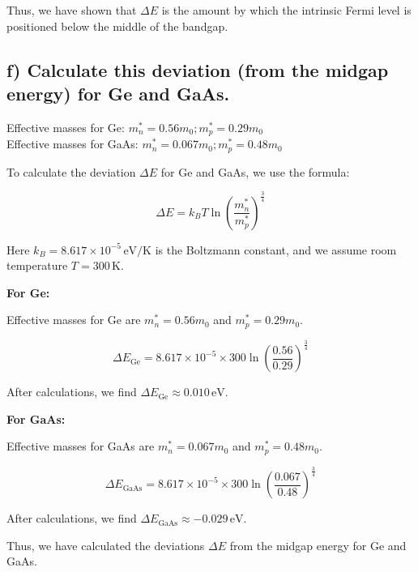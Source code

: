 Thus, we have shown that \( \Delta E \) is the amount by which the intrinsic Fermi level is positioned below the middle of the bandgap.

\subsection*{f) Calculate this deviation (from the midgap energy) for Ge and GaAs.}

Effective masses for Ge: $m_n^* = 0.56m_0;m_p^*=0.29m_0$\\
Effective masses for GaAs: $m_n^* = 0.067m_0;m_p^*=0.48m_0$

To calculate the deviation \( \Delta E \) for Ge and GaAs, we use the formula:

\begin{equation*}
\Delta E = k_B T \ln\left(\frac{m_{n}^{*}}{m_{p}^{*}}\right)^{\frac{3}{4}}
\end{equation*}

Here \( k_B = 8.617 \times 10^{-5} \, \text{eV/K} \) is the Boltzmann constant, and we assume room temperature \( T = 300 \, \text{K} \).

\textbf{For Ge:}

Effective masses for Ge are \( m_n^* = 0.56m_0 \) and \( m_p^* = 0.29m_0 \).

\begin{equation*}
\Delta E_{\text{Ge}} = 8.617 \times 10^{-5} \times 300 \ln\left(\frac{0.56}{0.29}\right)^{\frac{3}{4}}
\end{equation*}

After calculations, we find \( \Delta E_{\text{Ge}} \approx 0.010 \, \text{eV} \).

\textbf{For GaAs:}

Effective masses for GaAs are \( m_n^* = 0.067m_0 \) and \( m_p^* = 0.48m_0 \).

\begin{equation*}
\Delta E_{\text{GaAs}} = 8.617 \times 10^{-5} \times 300 \ln\left(\frac{0.067}{0.48}\right)^{\frac{3}{4}}
\end{equation*}

After calculations, we find \( \Delta E_{\text{GaAs}} \approx -0.029 \, \text{eV} \).

Thus, we have calculated the deviations \( \Delta E \) from the midgap energy for Ge and GaAs.
